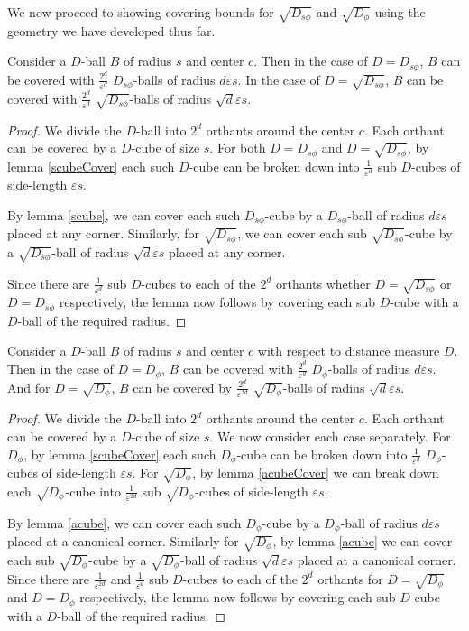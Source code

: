 \documentclass[11pt]{myclass}
\newcommand{\breg}{\ensuremath{D_\phi}}
\newcommand{\sbreg}{\ensuremath{D_{s\phi}}}
\newcommand{\eps}{\varepsilon}
\begin{document}
We now proceed to showing covering bounds for $\sqrt{\sbreg}$ and $\sqrt{\breg}$ using the geometry we have developed thus far.

\begin{lemma}\label{sballcover}
Consider a $D$-ball $B$ of radius $s$ and center $c$.
Then in the case of $D=\sbreg$, $B$ can be covered with $\frac{2^d}{\eps^d}$ $\sbreg$-balls of radius $d \eps s$. In the case of $D=\sqrt{\sbreg}$, $B$ can be covered with 
$\frac{2^d}{\eps^d}$ $\sqrt{\sbreg}$-balls of radius $\sqrt{d} \eps s$. 
\end{lemma}
\begin{proof}
We divide the $D$-ball into $2^d$ orthants around the center $c$. Each orthant can be covered by a $D$-cube of size $s$. 
For both $D=\sbreg$ and $D=\sqrt{\sbreg}$, by lemma \ref{scubeCover} each such $D$-cube can be broken down 
into $\frac{1}{\eps^d}$ sub $D$-cubes of side-length $\eps s$.

By lemma \ref{scube}, we can cover each such $\sbreg$-cube by a $\sbreg$-ball of radius $d \eps s$ placed at any corner. Similarly, for $\sqrt{\sbreg}$, we can cover each
sub $\sqrt{\sbreg}$-cube by a $\sqrt{\sbreg}$-ball of radius $\sqrt{d} \eps {s}$ placed at any corner. 


Since there are $\frac{1}{\eps^d}$ sub $D$-cubes to each of the $2^d$ orthants whether $D=\sqrt{\sbreg}$ or
$D=\sbreg$ respectively, the lemma now follows by covering each sub $D$-cube with a $D$-ball of the required radius.
\end{proof}



\begin{lemma}\label{aballcover}
Consider a $D$-ball $B$ of radius $s$ and center $c$ with respect to distance measure $D$.
Then in the case of $D= \breg$, $B$ can be covered with $\frac{2^d}{\eps^d}$ $\breg$-balls of radius $d \eps s$. And for  $D=\sqrt{\breg}$, $B$ can be 
covered by $\frac{2^d}{\eps^{2d}}$ $\sqrt{\breg}$-balls of radius $\sqrt{d} \eps s$. 
\end{lemma}

\begin{proof}
We divide the $D$-ball into $2^d$ orthants around the center $c$. Each orthant can be covered by a $D$-cube of size $s$. We now consider each case separately.
For $\breg$,  by lemma \ref{scubeCover} each such $\breg$-cube can be broken down 
into $\frac{1}{\eps^d}$ $\breg$-cubes of side-length $\eps s$. For $\sqrt{\breg}$, by lemma \ref{acubeCover} we can break down each $\sqrt{\breg}$-cube into 
$\frac{1}{\eps^{2d}}$ sub $\sqrt{\breg}$-cubes of side-length $\eps s$.

By lemma \ref{acube}, we can cover each such $\breg$-cube by a $\breg$-ball of radius $d \eps s$ placed at a canonical corner. Similarly for $\sqrt{\breg}$, by lemma \ref{acube} we can cover each
sub $\sqrt{\breg}$-cube by a $\sqrt{\breg}$-ball of radius $\sqrt{d} \eps {s}$ placed at a canonical corner. 
Since there are $\frac{1}{\eps^{2d}}$ and $\frac{1}{\eps^d}$ sub $D$-cubes to each of the $2^d$ orthants for $D=\sqrt{\breg}$ and
$D=\breg$ respectively, the lemma now follows by covering each sub $D$-cube with a $D$-ball of the required radius.
\end{proof}
\end{document}
